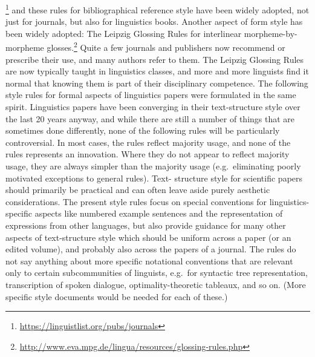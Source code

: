 \documentclass[a4paper]{article}
\begin{document}
\footnote{\url{https://linguistlist.org/pubs/journals}} and these rules for
bibliographical reference style have been widely adopted, not just for
journals, but also for linguistics books. Another aspect of form style
has been widely adopted: The Leipzig Glossing Rules for interlinear
morpheme-by-morpheme glosses.\footnote{\url{http://www.eva.mpg.de/lingua/resources/glossing-rules.php}}
Quite a few
journals and publishers now recommend or prescribe their use, and many
authors refer to them. The Leipzig Glossing Rules are now typically
taught in linguistics classes, and more and more linguists find it
normal that knowing them is part of their disciplinary competence. The
following style rules for formal aspects of linguistics papers were
formulated in the same spirit. Linguistics papers have been converging
in their text-structure style over the last 20 years anyway, and while
there are still a number of things that are sometimes done differently,
none of the following rules will be particularly controversial. In most
cases, the rules reflect majority usage, and none of the rules
represents an innovation. Where they do not appear to reflect majority
usage, they are always simpler than the majority usage (e.g.~eliminating
poorly motivated exceptions to general rules). Text- structure style for
scientific papers should primarily be practical and can often leave
aside purely aesthetic considerations. The present style rules focus on
special conventions for linguistics-specific aspects like numbered
example sentences and the representation of expressions from other
languages, but also provide guidance for many other aspects of
text-structure style which should be uniform across a paper (or an
edited volume), and probably also across the papers of a journal. The
rules do not say anything about more specific notational conventions
that are relevant only to certain subcommunities of linguists, e.g.~for
syntactic tree representation, transcription of spoken dialogue,
optimality-theoretic tableaux, and so on. (More specific style documents
would be needed for each of these.)
\end{document}
